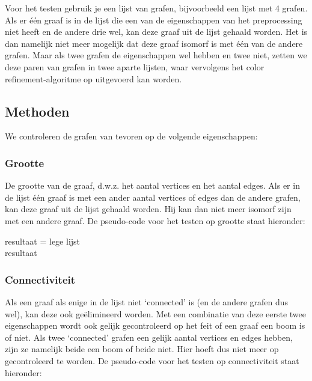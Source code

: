 \documentclass{article}
\begin{document}
\begin{algorithm}[H]
Voor het testen gebruik je een lijst van grafen, bijvoorbeeld een lijst met 4 grafen. Als er \'e\'en graaf is in de lijst die een van de eigenschappen van het preprocessing niet heeft en de andere drie wel, kan deze graaf uit de lijst gehaald worden. Het is dan namelijk niet meer mogelijk dat deze graaf isomorf is met \'e\'en van de andere grafen. Maar als twee grafen de eigenschappen wel hebben en twee niet, zetten we deze paren van grafen in twee aparte lijsten, waar vervolgens het color refinement-algoritme op uitgevoerd kan worden.

\subsection{Methoden}
We controleren de grafen van tevoren op de volgende eigenschappen:
\subsubsection{Grootte}
De grootte van de graaf, d.w.z. het aantal vertices en het aantal edges. Als er in de lijst één graaf is met een ander aantal vertices of edges dan de andere grafen, kan deze graaf uit de lijst gehaald worden. Hij kan dan niet meer isomorf zijn met een andere graaf. De pseudo-code voor het testen op grootte staat hieronder:\\

\begin{algorithm}[H]
	resultaat = lege lijst\\
	\Return resultaat
\end{algorithm}

\subsubsection{Connectiviteit}
Als een graaf als enige in de lijst niet ‘connected’ is (en de andere grafen dus wel), kan deze ook ge\"elimineerd worden. Met een combinatie van deze eerste twee eigenschappen wordt ook gelijk gecontroleerd op het feit of een graaf een boom is of niet. Als twee ‘connected’ grafen een gelijk aantal vertices en edges hebben, zijn ze namelijk beide een boom of beide niet. Hier hoeft dus niet meer op gecontroleerd te worden. De pseudo-code voor het testen op connectiviteit staat hieronder:\\


\end{algorithm}
\end{document}

